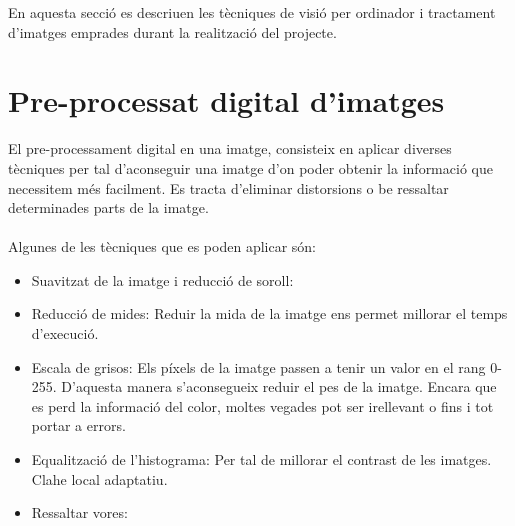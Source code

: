En aquesta secció es descriuen les tècniques de visió per ordinador i tractament d'imatges emprades durant la realització del projecte.

\section{Pre-processat digital d'imatges}
	El pre-processament digital en una imatge, consisteix en aplicar diverses tècniques per tal d'aconseguir una imatge d'on poder obtenir la informació que necessitem més facilment. Es tracta
	d'eliminar distorsions o be ressaltar determinades parts de la imatge.\\\\
	Algunes de les tècniques que es poden aplicar són:

	\begin{itemize}	
		\item{Suavitzat de la imatge i reducció de soroll: }
		\item{Reducció de mides: Reduir la mida de la imatge ens permet millorar el temps d'execució.}
		\item{Escala de grisos: Els píxels de la imatge passen a tenir un valor en el rang 0-255. D'aquesta manera s'aconsegueix reduir el pes de la imatge. Encara que es perd la informació del color, moltes
		vegades pot ser irellevant o fins i tot portar a errors.}
		\item{Equalització de l'histograma: Per tal de millorar el contrast de les imatges. Clahe local adaptatiu.}
		\item{Ressaltar vores: }
	\end{itemize}
	

\newpage
